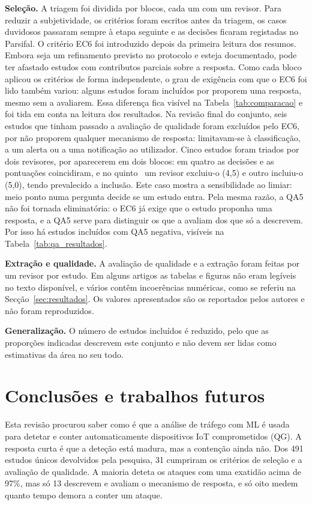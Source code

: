 \documentclass[conference,a4paper]{IEEEtran}
\begin{document}
\textbf{Seleção.} A triagem foi dividida por blocos, cada um com um revisor. Para reduzir
a subjetividade, os critérios foram escritos antes da triagem, os casos duvidosos
passaram sempre à etapa seguinte e as decisões ficaram registadas no Parsifal. O critério
EC6 foi introduzido depois da primeira leitura dos resumos. Embora seja um refinamento
previsto no protocolo e esteja documentado, pode ter afastado estudos com contributos
parciais sobre a resposta. Como cada bloco aplicou os critérios de forma independente, o
grau de exigência com que o EC6 foi lido também variou: alguns estudos foram incluídos
por proporem uma resposta, mesmo sem a avaliarem. Essa diferença fica visível na
Tabela~\ref{tab:comparacao} e foi tida em conta na leitura dos resultados. Na revisão
final do conjunto, seis estudos que tinham passado a avaliação de qualidade foram
excluídos pelo EC6, por não proporem qualquer mecanismo de resposta: limitavam-se à
classificação, a um alerta ou a uma notificação ao utilizador.
Cinco estudos foram triados por dois revisores, por aparecerem em dois blocos: em
quatro as decisões e as pontuações coincidiram, e no quinto~\cite{karibandi2025cyberdome}
um revisor excluiu-o (4,5) e outro incluiu-o (5,0), tendo prevalecido a inclusão. Este
caso mostra a sensibilidade ao limiar: meio ponto numa pergunta decide se um estudo entra.
Pela mesma razão, a QA5 não foi tornada eliminatória: o EC6 já exige que o estudo
proponha uma resposta, e a QA5 serve para distinguir os que a avaliam dos que só a
descrevem. Por isso há estudos incluídos com QA5 negativa, visíveis na
Tabela~\ref{tab:qa_resultados}.

\textbf{Extração e qualidade.} A avaliação de qualidade e a extração foram feitas por um
revisor por estudo. Em alguns artigos as tabelas e figuras não eram legíveis no texto
disponível, e vários contêm incoerências numéricas, como se referiu na
Secção~\ref{sec:resultados}. Os valores apresentados são os reportados pelos autores e não
foram reproduzidos.

\textbf{Generalização.} O número de estudos incluídos é reduzido, pelo que as proporções
indicadas descrevem este conjunto e não devem ser lidas como estimativas da área no seu
todo.

\section{Conclusões e trabalhos futuros}\label{sec:conclusoes}
Esta revisão procurou saber como é que a análise de tráfego com ML é usada para detetar
e conter automaticamente dispositivos IoT comprometidos (QG). A resposta curta é que a
deteção está madura, mas a contenção ainda não. Dos 491 estudos únicos devolvidos pela
pesquisa, 31 cumpriram os critérios de seleção e a avaliação de qualidade. A maioria
deteta os ataques com uma exatidão acima de 97\%, mas só 13 descrevem e avaliam o
mecanismo de resposta, e só oito medem quanto tempo demora a conter um ataque.
\end{document}
